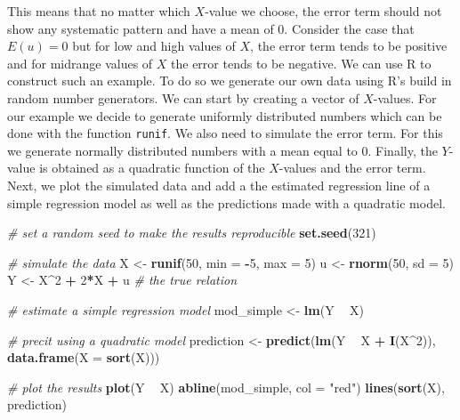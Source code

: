 \documentclass[]{book}
\newenvironment{Shaded}{\begin{snugshade}}{\end{snugshade}}
\newcommand{\KeywordTok}[1]{\textcolor[rgb]{0.13,0.29,0.53}{\textbf{#1}}}
\newcommand{\DataTypeTok}[1]{\textcolor[rgb]{0.13,0.29,0.53}{#1}}
\newcommand{\DecValTok}[1]{\textcolor[rgb]{0.00,0.00,0.81}{#1}}
\newcommand{\StringTok}[1]{\textcolor[rgb]{0.31,0.60,0.02}{#1}}
\newcommand{\CommentTok}[1]{\textcolor[rgb]{0.56,0.35,0.01}{\textit{#1}}}
\newcommand{\OperatorTok}[1]{\textcolor[rgb]{0.81,0.36,0.00}{\textbf{#1}}}
\newcommand{\NormalTok}[1]{#1}
\theoremstyle{definition}
\theoremstyle{definition}
\theoremstyle{definition}
\theoremstyle{remark}
\begin{document}
This means that no matter which \(X\)-value we choose, the error term
should not show any systematic pattern and have a mean of \(0\).
Consider the case that \(E(u) = 0\) but for low and high values of
\(X\), the error term tends to be positive and for midrange values of
\(X\) the error tends to be negative. We can use R to construct such an
example. To do so we generate our own data using R's build in random
number generators. We can start by creating a vector of \(X\)-values.
For our example we decide to generate uniformly distributed numbers
which can be done with the function \texttt{runif}. We also need to
simulate the error term. For this we generate normally distributed
numbers with a mean equal to \(0\). Finally, the \(Y\)-value is obtained
as a quadratic function of the \(X\)-values and the error term. Next, we
plot the simulated data and add a the estimated regression line of a
simple regression model as well as the predictions made with a quadratic
model.

\begin{Shaded}
\begin{Highlighting}[]
\CommentTok{# set a random seed to make the results reproducible}
\KeywordTok{set.seed}\NormalTok{(}\DecValTok{321}\NormalTok{)}

\CommentTok{# simulate the data }
\NormalTok{X <-}\StringTok{ }\KeywordTok{runif}\NormalTok{(}\DecValTok{50}\NormalTok{, }\DataTypeTok{min =} \OperatorTok{-}\DecValTok{5}\NormalTok{, }\DataTypeTok{max =} \DecValTok{5}\NormalTok{)}
\NormalTok{u <-}\StringTok{ }\KeywordTok{rnorm}\NormalTok{(}\DecValTok{50}\NormalTok{, }\DataTypeTok{sd =} \DecValTok{5}\NormalTok{)             }
\NormalTok{Y <-}\StringTok{ }\NormalTok{X}\OperatorTok{^}\DecValTok{2} \OperatorTok{+}\StringTok{ }\DecValTok{2}\OperatorTok{*}\NormalTok{X }\OperatorTok{+}\StringTok{ }\NormalTok{u }\CommentTok{# the true relation                  }

\CommentTok{# estimate a simple regression model }
\NormalTok{mod_simple <-}\StringTok{ }\KeywordTok{lm}\NormalTok{(Y }\OperatorTok{~}\StringTok{ }\NormalTok{X)}

\CommentTok{# precit using a quadratic model }
\NormalTok{prediction <-}\StringTok{ }\KeywordTok{predict}\NormalTok{(}\KeywordTok{lm}\NormalTok{(Y }\OperatorTok{~}\StringTok{ }\NormalTok{X }\OperatorTok{+}\StringTok{  }\KeywordTok{I}\NormalTok{(X}\OperatorTok{^}\DecValTok{2}\NormalTok{)), }\KeywordTok{data.frame}\NormalTok{(}\DataTypeTok{X =} \KeywordTok{sort}\NormalTok{(X)))}

\CommentTok{# plot the results}
\KeywordTok{plot}\NormalTok{(Y }\OperatorTok{~}\StringTok{ }\NormalTok{X)}
\KeywordTok{abline}\NormalTok{(mod_simple, }\DataTypeTok{col =} \StringTok{"red"}\NormalTok{)}
\KeywordTok{lines}\NormalTok{(}\KeywordTok{sort}\NormalTok{(X), prediction)}
\end{Highlighting}
\end{Shaded}
\end{document}
